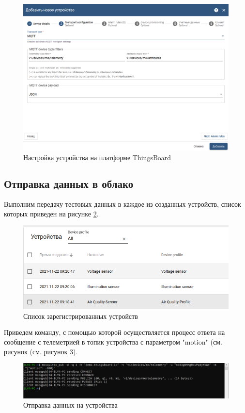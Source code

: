 \documentclass[a4paper,14pt]{extarticle}
\newcommand{\tb}{ThingsBoard~}
\begin{document}
\begin{figure}[h!]
	\centering
	\includegraphics[width=0.7\linewidth]{images/task9-create2}
	\caption{Настройка устройства на платформе \tb}
	\label{fig:task9-create2}
\end{figure}

\subsection{Отправка данных в облако}

Выполним передачу тестовых данных в каждое из созданных устройств, список которых приведен на рисунке \ref{fig:devices}.

\begin{figure}[h!]
	\centering
	\includegraphics[width=0.7\linewidth]{images/devices}
	\caption{Список зарегистрированных устройств}
	\label{fig:devices}
\end{figure}

Приведем команду, с помощью которой осуществляется процесс ответа на сообщение с телеметрией в топик устройства с параметром "motion" (см. рисунок (см. рисунок \ref{fig:send}).

\begin{figure}[h!]
	\centering
	\includegraphics[width=0.7\linewidth]{images/send}
	\caption{Отправка данных на устройства}
	\label{fig:send}
\end{figure}
\end{document}
